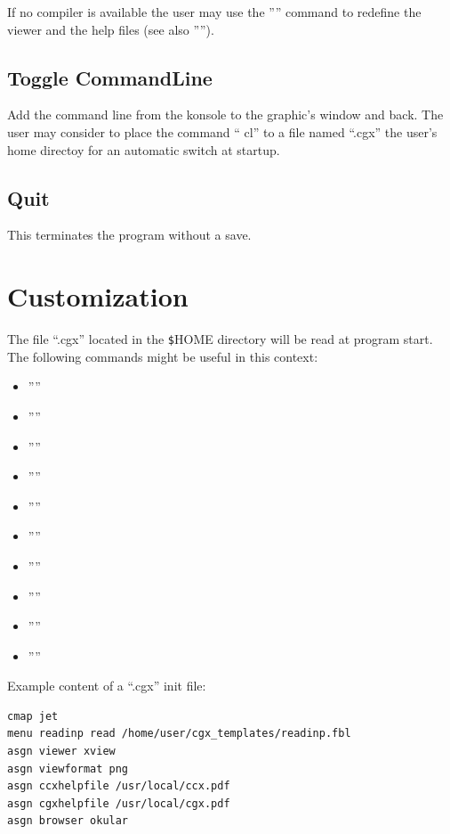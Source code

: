 \documentclass{article}
\begin{document}
If no compiler is available the user may use the '''' command to redefine the viewer and the help files (see also '''').

\subsection{\label{Toggle CommandLine}Toggle CommandLine}
Add the command line from the konsole to the graphic's window and back. The user may consider to place the command `` cl'' to a file named ``.cgx'' the user's home directoy for an automatic switch at startup.

\subsection{\label{Quit}Quit}
This terminates the program without a save.

\section{\label{Customization}Customization}
The file ``.cgx'' located in the \verb_$_HOME directory will be read at program start. The following commands might be useful in this context: 
\begin{itemize}
\item ''''
\item ''''
\item ''''
\item ''''
\item ''''
\item ''''
\item ''''
\item ''''
\item ''''
\item ''''
\end{itemize}
Example content of a ``.cgx'' init file:
\begin{verbatim}
cmap jet
menu readinp read /home/user/cgx_templates/readinp.fbl
asgn viewer xview
asgn viewformat png
asgn ccxhelpfile /usr/local/ccx.pdf
asgn cgxhelpfile /usr/local/cgx.pdf
asgn browser okular
\end{verbatim}
\end{document}
